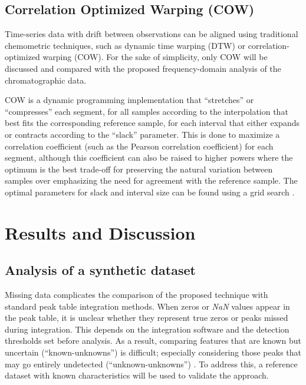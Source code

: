 \documentclass[preprint,12pt]{elsarticle}
\begin{document}
\subsection{Correlation Optimized Warping (COW)}

Time-series data with drift between observations can be aligned using traditional chemometric techniques, such as dynamic time warping (DTW)\cite{wang1987time} or correlation-optimized warping (COW)\cite{nielsen1998aligning}. For the sake of simplicity, only COW will be discussed and compared with the proposed frequency-domain analysis of the chromatographic data.

COW is a dynamic programming implementation that ``stretches'' or ``compresses'' each segment, for all samples according to the interpolation that best fits the corresponding reference sample, for each interval that either expands or contracts according to the ``slack'' parameter. This is done to maximize a correlation coefficient (such as the Pearson correlation coefficient) for each segment, although this coefficient can also be raised to higher powers where the optimum is the best trade-off for preserving the natural variation between samples over emphasizing the need for agreement with the reference sample. The optimal parameters for slack and interval size can be found using a grid search \cite{skov2006automated, tomasi2004correlation}.


\section{Results and Discussion}

\subsection{Analysis of a synthetic dataset}\label{sec:2.1}

Missing data complicates the comparison of the proposed technique with standard peak table integration methods. When zeros or \textit{NaN} values appear in the peak table, it is unclear whether they represent true zeros or peaks missed during integration. This depends on the integration software and the detection thresholds set before analysis. As a result, comparing features that are known but uncertain (“known-unknowns”) is difficult; especially considering those peaks that may go entirely undetected (“unknown-unknowns”) \cite{rumsfeld2002}. To address this, a reference dataset with known characteristics will be used to validate the approach.
\end{document}
